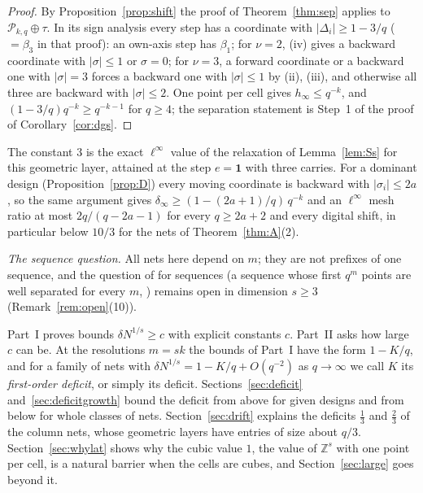 \documentclass[11pt]{amsart}
\makeatletter
\theoremstyle{definition}
\theoremstyle{plain}
\renewcommand\part{\@startsection{part}{0}{\z@}{2\linespacing\@plus\linespacing}{\linespacing}{\normalfont\large\bfseries\centering}}
\newcommand{\Z}{\mathbb{Z}}
\makeatother
\begin{document}
\begin{proof}
By Proposition~\ref{prop:shift} the proof of Theorem~\ref{thm:sep} applies to $\mathcal P_{k,q}\oplus\tau$. In its sign analysis every step has a coordinate with $|\Delta_i|\ge1-3/q$ ($=\beta_3$ in that proof): an own-axis step has $\beta_1$; for $\nu=2$, (iv) gives a backward coordinate with $|\sigma|\le1$ or $\sigma=0$; for $\nu=3$, a forward coordinate or a backward one with $|\sigma|=3$ forces a backward one with $|\sigma|\le1$ by (ii), (iii), and otherwise all three are backward with $|\sigma|\le2$. One point per cell gives $h_\infty\le q^{-k}$, and $(1-3/q)q^{-k}\ge q^{-k-1}$ for $q\ge4$; the separation statement is Step~1 of the proof of Corollary~\ref{cor:dgs}.
\end{proof}

The constant $3$ is the exact $\ell^\infty$ value of the relaxation of Lemma~\ref{lem:Ss} for this geometric layer, attained at the step $e=\mathbf 1$ with three carries. For a dominant design (Proposition~\ref{prop:D}) every moving coordinate is backward with $|\sigma_i|\le2a$, so the same argument gives $\delta_\infty\ge(1-(2a+1)/q)\,q^{-k}$ and an $\ell^\infty$ mesh ratio at most $2q/(q-2a-1)$ for every $q\ge2a+2$ and every digital shift, in particular below $10/3$ for the nets of Theorem~\ref{thm:A}(2).

\emph{The sequence question.} All nets here depend on $m$; they are not prefixes of one sequence, and the question of \cite{DGS2} for sequences (a sequence whose first $q^m$ points are well separated for every $m$, \cite[Def.~3.8]{DGS2}) remains open in dimension $s\ge3$ (Remark~\ref{rem:open}(10)).

\part{Separation constants}\label{part:constants}
Part~I proves bounds $\delta N^{1/s}\ge c$ with explicit constants $c$. Part~II asks how large $c$ can be. At the resolutions $m=sk$ the bounds of Part~I have the form $1-K/q$, and for a family of nets with $\delta N^{1/s}=1-K/q+O(q^{-2})$ as $q\to\infty$ we call $K$ its \emph{first-order deficit}, or simply its deficit. Sections~\ref{sec:deficit} and~\ref{sec:deficitgrowth} bound the deficit from above for given designs and from below for whole classes of nets. Section~\ref{sec:drift} explains the deficits $\frac13$ and $\frac23$ of the column nets, whose geometric layers have entries of size about $q/3$. Section~\ref{sec:whylat} shows why the cubic value $1$, the value of $\Z^s$ with one point per cell, is a natural barrier when the cells are cubes, and Section~\ref{sec:large} goes beyond it.
\end{document}
